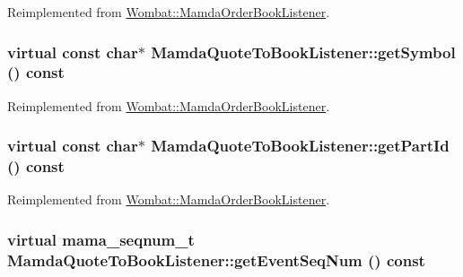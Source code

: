 Reimplemented from \hyperlink{classWombat_1_1MamdaOrderBookListener_882be50b668154aed7f170dbb2f47d34}{Wombat::Mamda\-Order\-Book\-Listener}.\hypertarget{classMamdaQuoteToBookListener_c93b05e297f0b56ee750c931c0c332da}{
\subsubsection[getSymbol]{\setlength{\rightskip}{0pt plus 5cm}virtual const char$\ast$ Mamda\-Quote\-To\-Book\-Listener::get\-Symbol () const}}
\label{classMamdaQuoteToBookListener_c93b05e297f0b56ee750c931c0c332da}




Reimplemented from \hyperlink{classWombat_1_1MamdaOrderBookListener_11b3e826a2aba8faf699c16454051143}{Wombat::Mamda\-Order\-Book\-Listener}.\hypertarget{classMamdaQuoteToBookListener_67a3d0c1e838d687724c0d20f15849cc}{
\subsubsection[getPartId]{\setlength{\rightskip}{0pt plus 5cm}virtual const char$\ast$ Mamda\-Quote\-To\-Book\-Listener::get\-Part\-Id () const}}
\label{classMamdaQuoteToBookListener_67a3d0c1e838d687724c0d20f15849cc}




Reimplemented from \hyperlink{classWombat_1_1MamdaOrderBookListener_43689c10340beb6c62cc5b6e9680e44f}{Wombat::Mamda\-Order\-Book\-Listener}.\hypertarget{classMamdaQuoteToBookListener_ad266e6ce78c83599aa9b0c380f2b5e0}{
\subsubsection[getEventSeqNum]{\setlength{\rightskip}{0pt plus 5cm}virtual mama\_\-seqnum\_\-t Mamda\-Quote\-To\-Book\-Listener::get\-Event\-Seq\-Num () const}}
\label{classMamdaQuoteToBookListener_ad266e6ce78c83599aa9b0c380f2b5e0}




